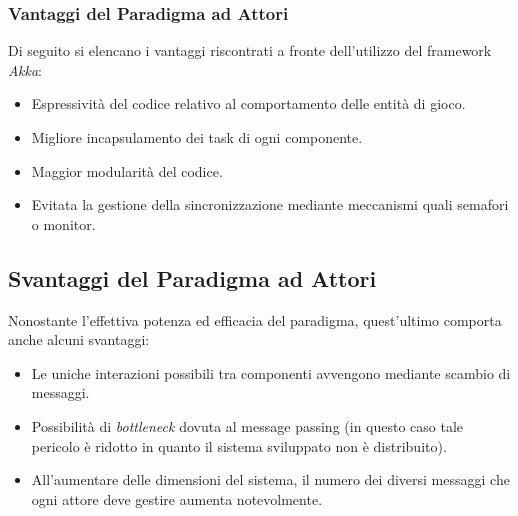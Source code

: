 \subsubsection{Vantaggi del Paradigma ad Attori}
Di seguito si elencano i vantaggi riscontrati a fronte dell'utilizzo del framework \textit{Akka}:
\begin{itemize}
    \item Espressività del codice relativo al comportamento delle entità di gioco.
    \item Migliore incapsulamento dei task di ogni componente.
    \item Maggior modularità del codice.
    \item Evitata la gestione della sincronizzazione mediante meccanismi quali semafori o monitor.
\end{itemize}

\subsection{Svantaggi del Paradigma ad Attori}
Nonostante l'effettiva potenza ed efficacia del paradigma, quest'ultimo comporta anche alcuni svantaggi:
\begin{itemize}
    \item Le uniche interazioni possibili tra componenti avvengono mediante scambio di messaggi.
    \item Possibilità di \textit{bottleneck} dovuta al message passing (in questo caso tale pericolo è ridotto in quanto il sistema sviluppato non è distribuito).
    \item All'aumentare delle dimensioni del sistema, il numero dei diversi messaggi che ogni attore deve gestire aumenta notevolmente.
\end{itemize}

